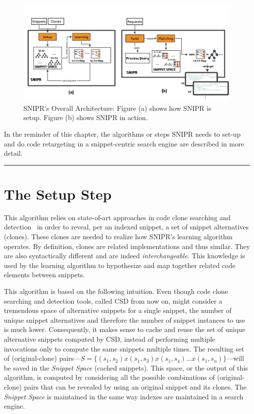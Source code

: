 \begin{figure}[!ht]
    \centering
    \includegraphics[width=\textwidth]{images/SnippetRetargetingApproach}
    \caption{SNIPR's Overall Architecture: Figure (a) shows how SNIPR is setup. Figure (b) shows SNIPR in action.}
    \label{fig:sniprentire}
\end{figure}

In the reminder of this chapter, the algorithms or steps \uppercase{SnipR} needs to set-up and do code retargeting in a snippet-centric search engine are described in more detail. 

\fancybreak{\pfbreakdisplay}

\section{The Setup Step}
\label{sec:precomputation}

This algorithm relies on state-of-art approaches in code clone searching and detection~\cite{Jiang:2007cj, Roh:2010ts} in order to reveal, per an indexed snippet, a set of snippet alternatives (clones). These clones are needed to realize how \uppercase{SnipR}'s learning algorithm operates. By definition, clones are related implementations and thus similar. They are also syntactically different and are indeed \emph{interchangeable}. This knowledge is used by the learning algorithm to hypothesize and map together related code elements between snippets. 

This algorithm is based on the following intuition. Even though code clone searching and detection tools, called CSD from now on, might consider a tremendous space of alternative snippets for a single snippet, the number of unique snippet alternatives and therefore the number of snippet instances to use is much lower. Consequently, it makes sense to cache and reuse the set of unique alternative snippets computed by CSD, instead of performing multiple invocations only to compute the same snippets multiple times. The resulting set of (original-clone) pairs---$S = \{(s_1, s_2) x (s_1, s_3) x (s_1, s_4) ... x (s_1, s_n)\}$---will be saved in the \emph{Snippet Space} (cached snippets). This space, or the output of this algorithm, is computed by considering all the possible combinations of (original-clone) pairs that can be revealed by using an original snippet and its clones. The \emph{Snippet Space} is maintained in the same way indexes are maintained in a search engine.

